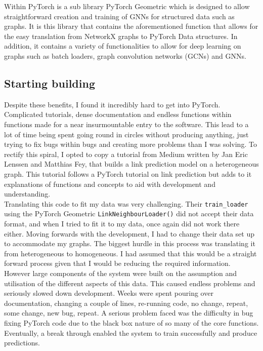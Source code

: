 \documentclass{l4proj}
\begin{document}
Within PyTorch is a sub library PyTorch Geometric which is designed to allow straightforward creation and training of GNNs for structured data such as graphs. It is this library that contains the aforementioned function that allows for the easy translation from NetworkX graphs to PyTorch Data structures. In addition, it contains a variety of functionalities to allow for deep learning on graphs such as batch loaders, graph convolution networks (GCNs) and GNNs. \\

\subsection{Starting building}

Despite these benefits, I found it incredibly hard to get into PyTorch. Complicated tutorials, dense documentation and endless functions within functions made for a near insurmountable entry to the software. This lead to a lot of time being spent going round in circles without producing anything, just trying to fix bugs within bugs and creating more problems than I was solving. To rectify this spiral, I opted to copy a tutorial from Medium written by Jan Eric Lenssen and Matthias Fey, that builds a link prediction model on a heterogeneous graph. This tutorial follows a PyTorch tutorial on link prediction but adds to it explanations of functions and concepts to aid with development and understanding. \\

Translating this code to fit my data was very challenging. Their \texttt{train\_loader} using the PyTorch Geometric \texttt{LinkNeighbourLoader()} did not accept their data format, and when I tried to fit it to my data, once again did not work there either. Moving forwards with the development, I had to change their data set up to accommodate my graphs. The biggest hurdle in this process was translating it from heterogeneous to homogeneous. I had assumed that this would be a straight forward process given that I would be reducing the required information. However large components of the system were built on the assumption and utilisation of the different aspects of this data. This caused endless problems and seriously slowed down development. Weeks were spent pouring over documentation, changing a couple of lines, re-running code, no change, repeat, some change, new bug, repeat. A serious problem faced was the difficulty in bug fixing PyTorch code due to the black box nature of so many of the core functions. Eventually, a break through enabled the system to train successfully and produce predictions. \\
\end{document}
